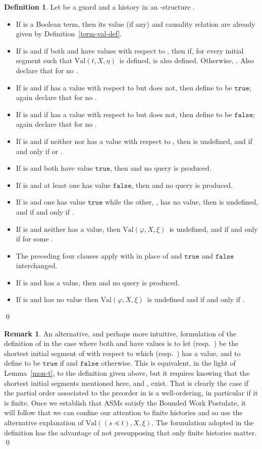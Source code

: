 \documentclass{LMCS}
\theoremstyle{definition}
\newtheorem{df}[thm]{Definition}
\newtheorem{rmk}[thm]{Remark}
\newenvironment{ls}{\begin{itemize}}{\end{itemize}}
\newcommand{\ttt}[1]{\ensuremath{\mathtt {#1}}}
\newcommand{\val}[3]{\ensuremath{\text{Val}(#1,#2,#3)}}
\renewcommand{\phi}{\varphi}
\begin{document}
\begin{df}   \label{guard-sem-def}
Let  be a guard and  a history in an -structure
.
\begin{ls}
  \item If  is a Boolean term, then its value (if any) and
  causality relation are already given by
  Definition~\ref{term-val-def}.
  \item If  is  and if both  and  have values
  with respect to , then  if, for every
  initial segment  such that \val tX\eta\ is defined,
   is also defined.  Otherwise, .  Also declare that  for no
  .
  \item If  is  and if  has a value with respect
  to  but  does not, then define  to be
  \ttt{true}; again declare that  for no .
  \item If  is  and if  has a value with respect
  to  but  does not, then define  to be
  \ttt{false}; again declare that  for no .
  \item If  is  and if neither  nor  has a
  value with respect to , then  is undefined,
  and  if and only if  or
  .
  \item If  is  and both  have value
  \ttt{true}, then  and no query is
  produced.
  \item If  is  and at least one  has
  value \ttt{false}, then  and no query
  is produced.
  \item If  is  and one  has value
  \ttt{true} while the other, , has no value, then
   is undefined, and  if and only if
  .
  \item If  is  and neither  has a
  value, then \val\phi X\xi\ is undefined, and 
  if and only if  for some .
  \item The preceding four clauses apply with  in place of
   and \ttt{true} and \ttt{false} interchanged.
  \item If  is  and  has a value, then
   and no query is produced.
  \item If  is  and  has no value then
  \val\phi X\xi\ is undefined and  if and only
  if .
\end{ls}
\qed\end{df}

\begin{rmk}
An alternative, and perhaps more intuitive, formulation of the
definition of  in the case where both  and
 have values is to let  (resp.\ ) be the shortest
initial segment of  with respect to which  (resp.\ ) has a
value, and to define  to be \ttt{true} if
 and \ttt{false} otherwise.  This is equivalent, in
the light of Lemma~\ref{mon-t}, to the definition given above, but it
requires knowing that the shortest initial segments mentioned here,
 and , exist.  That is clearly the case if the partial
order associated to the preorder in  is a well-ordering, in
particular if it is finite.  Once we establish that ASMs satisfy the
Bounded Work Postulate, it will follow that we can confine our
attention to finite histories and so use the alternative explanation
of \val{(s\preceq t)}X\xi.  The formulation adopted in the definition
has the advantage of not presupposing that only finite histories
matter.
\qed\end{rmk}
\end{document}
